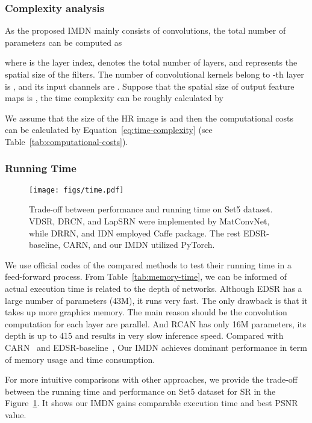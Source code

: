 \documentclass[sigconf]{acmart}
\begin{document}
\subsubsection{Complexity analysis}
As the proposed IMDN mainly consists of convolutions, the total number of parameters can be computed as

where  is the layer index,  denotes the total number of layers, and  represents the spatial size of the filters. The number of convolutional kernels belong to -th layer is , and its input channels are . Suppose that the spatial size of output feature maps is , the time complexity can be roughly calculated by

We assume that the size of the HR image is  and then the computational costs can be calculated by Equation~\ref{eq:time-complexity} (see Table~\ref{tab:computational-costs}).

\subsubsection{Running Time}
\begin{figure}[htpb]
	\centering
	\texttt{[image: figs/time.pdf]}
	\vspace{-1mm}
	\caption{Trade-off between performance and running time on Set5  dataset. VDSR, DRCN, and LapSRN were implemented by MatConvNet, while DRRN, and IDN employed Caffe package. The rest EDSR-baseline, CARN, and our IMDN utilized PyTorch.}
	\label{fig:time}
	\vspace{-1mm}
\end{figure}

We use official codes of the compared methods to test their running time in a feed-forward process. From Table~\ref{tab:memory-time}, we can be informed of actual execution time is related to the depth of networks. Although EDSR has a large number of parameters (43M), it runs very fast. The only drawback is that it takes up more graphics memory. The main reason should be the convolution computation for each layer are parallel. And RCAN has only 16M parameters, its depth is up to 415 and results in very slow inference speed. Compared with CARN~\cite{CARN} and EDSR-baseline~\cite{EDSR}, Our IMDN achieves dominant performance in term of memory usage and time consumption.

For more intuitive comparisons with other approaches, we provide the trade-off between the running time and performance on Set5 dataset for  SR in the Figure~\ref{fig:time}. It shows our IMDN gains comparable execution time and best PSNR value.
\end{document}

